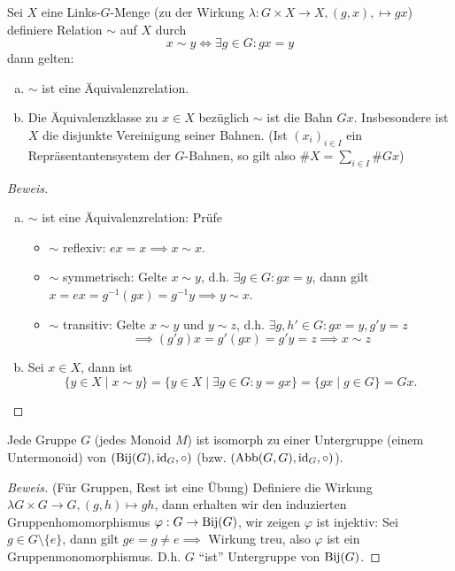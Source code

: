 \documentclass[a4paper]{report}
\begin{document}
\begin{prop}
  Sei $X$ eine Links-$G$-Menge (zu der Wirkung $\lambda: G \times X \to X, (g,x), \mapsto gx$) definiere Relation $\sim$ auf $X$ durch
  $$x \sim y \iff \exists g \in G : gx = y$$
  dann gelten:
  \begin{enumerate}[(a)]
    \item $\sim$ ist eine Äquivalenzrelation.
    \item Die Äquivalenzklasse zu $x \in X$ bezüglich $\sim$ ist die Bahn $Gx$. Insbesondere ist $X$ die disjunkte Vereinigung seiner Bahnen. (Ist $(x_{i})_{i \in I}$ ein Repräsentantensystem der $G$-Bahnen, so gilt also $\#X = \sum_{i \in I}\#Gx$)
  \end{enumerate}
\end{prop}
\begin{proof}[Beweis]
  \begin{enumerate}[(a)]
    \item $\sim$ ist eine Äquivalenzrelation: Prüfe
          \begin{itemize}
          \item $\sim$ reflexiv: $ex = x \implies x \sim x.$
          \item $\sim$ symmetrisch: Gelte $x \sim y$, d.h. $\exists g \in G : gx = y$, dann gilt $x = ex = g^{-1}(gx) = g^{-1}y \implies y \sim x$.
            \item $\sim$ transitiv: Gelte $x \sim y$ und $y \sim z$, d.h. $\exists g, h' \in G : gx = y, g'y = z$
                  $$\implies (g'g)x = g'(gx) = g'y = z \implies x \sim z$$
          \end{itemize}
    \item Sei $x \in X$, dann ist $$\{y \in X \mid x \sim y\} = \{y \in X \mid \exists g \in G : y = gx\} = \{gx \mid g \in G\} = Gx.$$
  \end{enumerate}
\end{proof}
\begin{satz}
\label{satz:Satz von Cayley}
Jede Gruppe $G$ (jedes Monoid $M$) ist isomorph zu einer Untergruppe (einem Untermonoid) von $(\operatorname{Bij}(G), \operatorname{id}_{G}, \circ)$ (bzw. $(\operatorname{Abb}(G,G), \operatorname{id}_{G}, \circ)$).
\end{satz}
\begin{proof}[Beweis](Für Gruppen, Rest ist eine Übung) Definiere die Wirkung $\lambda G \times G \to G, (g,h) \mapsto gh$, dann erhalten wir den induzierten Gruppenhomomorphismus $\varphi: G \to \operatorname{Bij}(G)$, wir zeigen $\varphi$ ist injektiv: Sei $g \in G \setminus \{e\}$, dann gilt $ge = g \ne e \implies$ Wirkung treu, also $\varphi$ ist ein Gruppenmonomorphismus. D.h. $G$ ``ist'' Untergruppe von $\operatorname{Bij}(G)$.
\end{proof}
\end{document}
